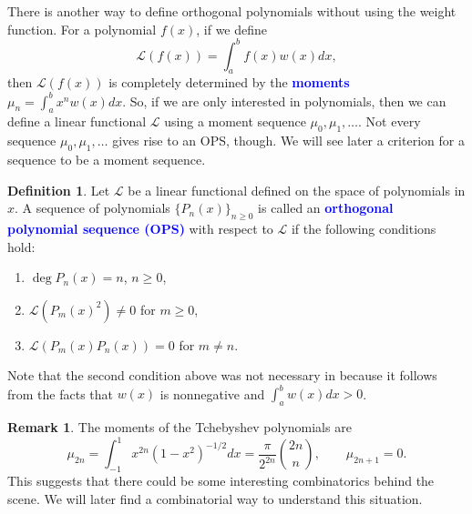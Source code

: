 \documentclass[oneside]{book}
\numberwithin{equation}{section}
\theoremstyle{definition}
\newtheorem{defn}[thm]{Definition}
\newtheorem{remark}[thm]{Remark}
\newcommand\LL{\mathcal{L}}
\renewcommand\emph[1]{\textcolor{blue}{\bf #1}}
\begin{document}
There is another way to define orthogonal polynomials without using
the weight function. For a polynomial \( f(x) \), if we define
\[
  \LL(f(x)) = \int_a^b f(x) w(x)dx,
\]
then \( \LL(f(x)) \) is completely determined by the \emph{moments}
\( \mu_n = \int_a^b x^n w(x)dx \). So, if we are only interested in
polynomials, then we can define a linear functional \( \LL \) using a
moment sequence \( \mu_0,\mu_1,\dots \). Not every sequence
\( \mu_0,\mu_1,\dots \) gives rise to an OPS, though. We will see
later a criterion for a sequence to be a moment sequence.

\begin{defn}\label{def:OPS2}
  Let \( \LL \) be a linear functional defined on the space of
  polynomials in \( x \). A sequence of polynomials
  \( \{P_n(x)\}_{n\ge0} \) is called an \emph{orthogonal polynomial
    sequence (OPS)} with respect to \( \LL \) if the following
  conditions hold:
  \begin{enumerate}
  \item \( \deg P_n(x) = n \), \( n\ge0 \),
  \item \( \LL(P_m(x)^2) \ne 0 \) for \( m\ge0 \),
  \item \( \LL(P_m(x)P_n(x))  = 0 \) for \( m\ne n \).
  \end{enumerate}
\end{defn}

Note that the second condition above was not necessary in
 because it follows from the facts that \( w(x) \) is
nonnegative and \( \int_a^b w(x)dx >0 \).

\begin{remark}
  The moments of the Tchebyshev polynomials are
  \[
    \mu_{2n} = \int_{-1}^1 x^{2n} (1-x^2)^{-1/2} dx
    = \frac{\pi}{2^{2n}} \binom{2n}{n}, \qquad
    \mu_{2n+1} = 0.
  \]
  This suggests that there could be some interesting combinatorics
  behind the scene. We will later find a combinatorial way to
  understand this situation.
\end{remark}
\end{document}
